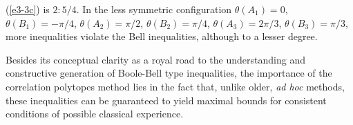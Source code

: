 (\ref{e3-3c}) is $2:5/4$.
In the less symmetric configuration
$\theta(A_1) = 0$,
$\theta(B_1) = -\pi /4$,
$\theta(A_2) = \pi / 2$,
$\theta(B_2) = \pi / 4$,
$\theta(A_3) = 2\pi /3$,
$\theta(B_3) = \pi / 3$,
more inequalities violate the Bell inequalities, although to a lesser degree.



Besides its conceptual clarity as a royal road  to the understanding
and constructive generation of Boole-Bell type inequalities,
the importance of the
correlation polytopes
method lies in the fact that,
unlike older, {\em ad hoc} methods,
these inequalities can be guaranteed to yield maximal bounds for consistent
conditions of possible classical experience.


%
%
%
%

